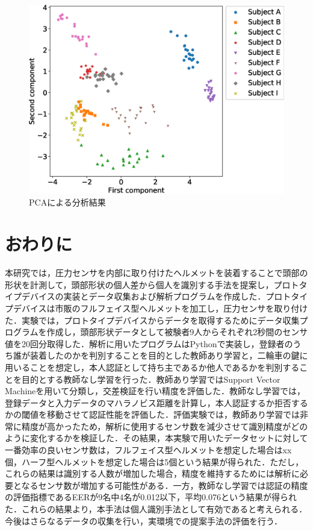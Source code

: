 \documentclass[Japanese,noauthor]{dicomopapers}
\begin{document}
\begin{figure}[!t]
  \centering
    \includegraphics[width=1\linewidth]{figure/PCA.eps}
  \caption{PCAによる分析結果}
  \label{PCA}
\end{figure}

\section{おわりに}
\label{conclude}
本研究では，圧力センサを内部に取り付けたヘルメットを装着することで頭部の形状を計測して，頭部形状の個人差から個人を識別する手法を提案し，プロトタイプデバイスの実装とデータ収集および解析プログラムを作成した．プロトタイプデバイスは市販のフルフェイス型ヘルメットを加工し，圧力センサを取り付けた．実験では，プロトタイプデバイスからデータを取得するためにデータ収集プログラムを作成し，頭部形状データとして被験者9人からそれぞれ2秒間のセンサ値を20回分取得した．解析に用いたプログラムはPythonで実装し，登録者のうち誰が装着したのかを判別することを目的とした教師あり学習と，二輪車の鍵に用いることを想定し，本人認証として持ち主であるか他人であるかを判別することを目的とする教師なし学習を行った．教師あり学習ではSupport Vector Machineを用いて分類し，交差検証を行い精度を評価した．教師なし学習では，登録データと入力データのマハラノビス距離を計算し，本人認証するか拒否するかの閾値を移動させて認証性能を評価した．評価実験では，教師あり学習では非常に精度が高かったため，解析に使用するセンサ数を減少させて識別精度がどのように変化するかを検証した．その結果，本実験で用いたデータセットに対して一番効率の良いセンサ数は，フルフェイス型ヘルメットを想定した場合はxx個，ハーフ型ヘルメットを想定した場合は5個という結果が得られた．ただし，これらの結果は識別する人数が増加した場合，精度を維持するためには解析に必要となるセンサ数が増加する可能性がある．一方，教師なし学習では認証の精度の評価指標であるEERが9名中4名が0.012以下，平均0.076という結果が得られた．これらの結果より，本手法は個人識別手法として有効であると考えられる．今後はさらなるデータの収集を行い，実環境での提案手法の評価を行う．



\end{document}
